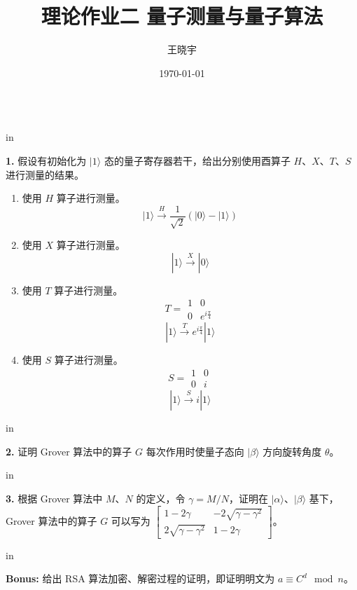 \documentclass[11pt]{article}
\begin{document}
\title{{\bf 理论作业二 \quad 量子测量与量子算法}}
\author{王晓宇 }
\date{\today}
\maketitle

\begin{tabular*}{13cm}{r}
\hline
\end{tabular*}

 in

{\bf 1.} 假设有初始化为 $|1\rangle$ 态的量子寄存器若干，给出分别使用酉算子 $H$、$X$、$T$、$S$ 进行测量的结果。

\begin{enumerate}
    \item 使用 $H$ 算子进行测量。
        \[|1\rangle \stackrel{H}\longrightarrow  \frac{1}{\sqrt{2}}\left( |0\rangle - |1\rangle\right)\]
    \item 使用 $X$ 算子进行测量。
        \[|1\rangle \stackrel{X}\longrightarrow  |0\rangle\]
    \item 使用 $T$ 算子进行测量。
        \[T = 
        \begin{matrix}
            1 & 0 \\
            0 & e^{i\frac{\pi}{4}}    
        \end{matrix}\]
        \[|1\rangle \stackrel{T}\longrightarrow  e^{i\frac{\pi}{4}}|1\rangle \]
    \item 使用 $S$ 算子进行测量。
        \[S = 
        \begin{matrix}
            1 & 0 \\
            0 & i    
        \end{matrix}\]
        \[|1\rangle \stackrel{S}\longrightarrow  i |1\rangle \]
\end{enumerate}


 in

{\bf 2.} 证明 Grover 算法中的算子 $G$ 每次作用时使量子态向 $|\beta\rangle$ 方向旋转角度 $\theta$。

 in

{\bf 3.} 根据 Grover 算法中 $M$、$N$ 的定义，令 $\gamma = M/N$，证明在 $|\alpha\rangle$、$|\beta\rangle$ 基下，Grover 算法中的算子 $G$ 可以写为 $\begin{bmatrix}
    1-2\gamma & -2\sqrt{\gamma-\gamma^2} \\ 2\sqrt{\gamma-\gamma^2} & 1-2\gamma
\end{bmatrix}$。

 in

{\bf Bonus:} 给出 RSA 算法加密、解密过程的证明，即证明明文为 $a \equiv C^d \mod n$。
\end{document}
